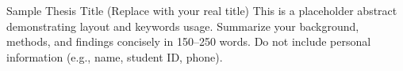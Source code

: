 \begin{enabstract}{Sample Thesis Title (Replace with your real title)}
This is a placeholder abstract demonstrating layout and keywords usage. Summarize your background, methods, and findings concisely in 150–250 words. Do not include personal information (e.g., name, student ID, phone).

\end{enabstract}

